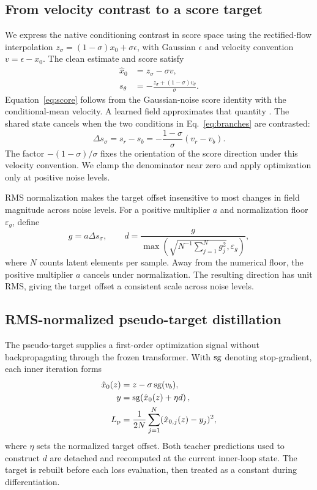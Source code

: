 \subsection{From velocity contrast to a score target}
\label{sec:target}
We express the native conditioning contrast in score space using the
rectified-flow interpolation
$z_\sigma=(1-\sigma)x_0+\sigma\epsilon$, with Gaussian $\epsilon$ and
velocity convention $v=\epsilon-x_0$. The clean estimate and score satisfy
\begin{align}
\hat x_0&=z_\sigma-\sigma v,\label{eq:clean}\\
s_\theta&=-\frac{z_\sigma+(1-\sigma)v_\theta}{\sigma}.
\label{eq:score}
\end{align}
Equation~\ref{eq:score} follows from the Gaussian-noise score identity with
the conditional-mean velocity. A learned field approximates that quantity
\citep{lipman2023flow,liu2023rectified}. The shared state cancels when the
two conditions in Eq.~\ref{eq:branches} are contrasted:
\begin{equation}
\Delta s_\sigma=s_r-s_b
=-\frac{1-\sigma}{\sigma}(v_r-v_b).
\label{eq:sign}
\end{equation}
The factor $-(1-\sigma)/\sigma$ fixes the orientation of the score
direction under this velocity convention. We clamp the denominator near
zero and apply optimization only at positive noise levels.

RMS normalization makes the target offset insensitive to most changes in
field magnitude across noise levels. For a positive multiplier $a$ and
normalization floor $\varepsilon_g$, define
\begin{equation}
g=a\Delta s_\sigma,\qquad
 d=\frac{g}{\max\!\left(\sqrt{N^{-1}\sum_{j=1}^N g_j^2},\varepsilon_g\right)},
\label{eq:normalization}
\end{equation}
where $N$ counts latent elements per sample. Away from the numerical
floor, the positive multiplier $a$ cancels under normalization. The
resulting direction has unit RMS, giving the target offset a consistent
scale across noise levels.

\subsection{RMS-normalized pseudo-target distillation}
\label{sec:optimization}
The pseudo-target supplies a first-order optimization signal without
backpropagating through the frozen transformer. With $\operatorname{sg}$ denoting
stop-gradient, each inner iteration forms
\begin{align}
\hat x_0(z)&=z-\sigma\operatorname{sg}(v_b),\\
y&=\operatorname{sg}\!\left(\hat x_0(z)+\eta d\right),\\
L_{\rm p}&=\frac{1}{2N}\sum_{j=1}^N(\hat x_{0,j}(z)-y_j)^2,
\label{eq:pseudoloss}
\end{align}
where $\eta$ sets the normalized target offset. Both teacher predictions
used to construct $d$ are detached and recomputed at the current inner-loop
state. The target is rebuilt before each loss evaluation, then treated as a
constant during differentiation.

